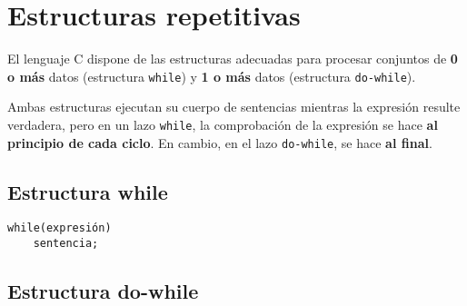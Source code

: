\begin{comment}
\begin{table}
\centering
\begin{tabular}{l|l|l}
Listado 1 & Listado 2 & Listado 3\\
\hline
\begin{codecell}
if(c >= 2) {
    if(d)
        c++;
} else
    c += 2;
\end{codecell}
&
\begin{codecell}
if(c >= 2) 
    if(d)
        c++;
else
    c += 2;
\end{codecell}
&
\begin{codecell}
if(c >= 2) { 
    if(d)
        c++;
	else
    	c += 2;
}
\end{codecell}\\
\end{tabular}
\caption{Estructuras alternativas anidadas e indentación.}
\label{tab:indent}
\end{table}
\end{comment}



\section{Estructuras repetitivas}

El lenguaje C dispone de las estructuras adecuadas para procesar conjuntos de \textbf{0 o más}
datos (estructura \lstinline{while}) y \textbf{1 o más} datos (estructura \lstinline{do-while}).

Ambas estructuras ejecutan su cuerpo de sentencias mientras la expresión
resulte verdadera, pero en un lazo \lstinline{while}, la comprobación de la expresión se hace \textbf{al principio de cada
ciclo}. En cambio, en el lazo \lstinline{do-while}, se hace \textbf{al final}.


\subsection{Estructura while}

\begin{lstlisting}
while(expresión)
    sentencia;
\end{lstlisting}

\subsection{Estructura do-while}

